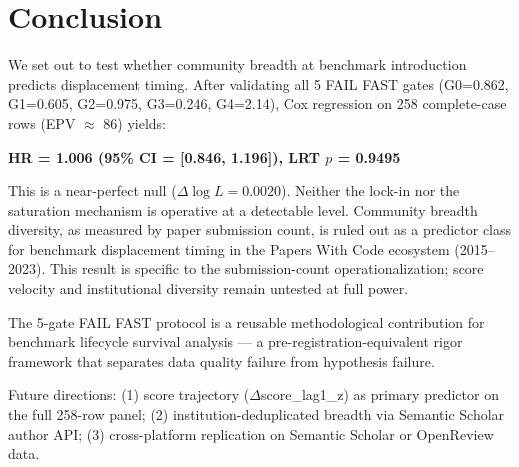 \section{Conclusion}

We set out to test whether community breadth at benchmark introduction predicts displacement timing. After validating all 5 FAIL FAST gates (G0=0.862, G1=0.605, G2=0.975, G3=0.246, G4=2.14), Cox regression on 258 complete-case rows (EPV $\approx$ 86) yields:

\begin{center}
\textbf{HR = 1.006 (95\% CI = [0.846, 1.196]), LRT $p$ = 0.9495}
\end{center}

This is a near-perfect null ($\Delta\log L = 0.0020$). Neither the lock-in nor the saturation mechanism is operative at a detectable level. Community breadth diversity, as measured by paper submission count, is ruled out as a predictor class for benchmark displacement timing in the Papers With Code ecosystem (2015--2023). This result is specific to the submission-count operationalization; score velocity and institutional diversity remain untested at full power.

The 5-gate FAIL FAST protocol is a reusable methodological contribution for benchmark lifecycle survival analysis --- a pre-registration-equivalent rigor framework that separates data quality failure from hypothesis failure.

Future directions: (1) score trajectory ($\Delta$score\_lag1\_z) as primary predictor on the full 258-row panel; (2) institution-deduplicated breadth via Semantic Scholar author API; (3) cross-platform replication on Semantic Scholar or OpenReview data.
